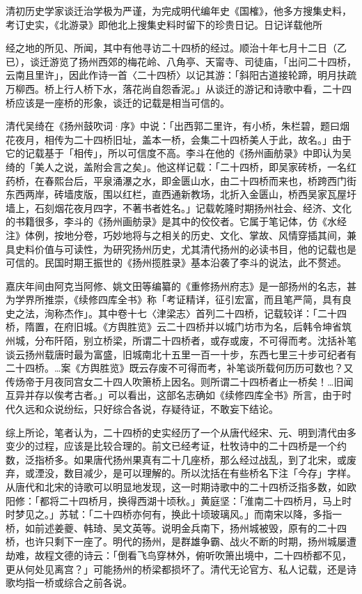 清初历史学家谈迁治学极为严谨，为完成明代编年史《国榷》，他多方搜集史料，考订史实，《北游录》即他北上搜集史料时留下的珍贵日记。日记详载他所


\noindent 经之地的所见、所闻，其中有他寻访二十四桥的经过。顺治十年七月十二日（乙已），谈迁游览了扬州西郊的梅花岭、八角亭、天甯寺、司徒庙，「出问二十四桥，云南且里许」，因此作诗一首〈二十四桥〉以记其游：「斜阳古道接轮蹄，明月扶疏万柳西。桥上行人桥下水，落花尚自怨香泥。」从谈迁的游记和诗歌中看，二十四桥应该是一座桥的形象，谈迁的记载是相当可信的。

清代吴绮在《扬州鼓吹词·序》中说：「出西郭二里许，有小桥，朱栏碧，题曰烟花夜月，相传为二十四桥旧址，盖本一桥，会集二十四桥美人于此，故名。」由于它的记载基于「相传」，所以可信度不高。李斗在他的《扬州画舫录》中即认为吴绮的「美人之说，盖附会言之矣」。他这样记载：「二十四桥，即吴家砖桥，一名红药桥，在春熙台后，平泉涌瀑之水，即金匮山水，由二十四桥而来也，桥跨西门街东西两岸，砖墙庋版，围以红栏，直西通新教场，北折入金匮山，桥西吴家瓦屋圩墙上，石刻烟花夜月四字，不著书者姓名。」记载乾隆时期扬州社会、经济、文化的书籍很多，李斗的《扬州画舫录》是其中的佼佼者。它属于笔记体，仿《水经注》体例，按地分卷，巧妙地将与之相关的历史、文化、掌故、风情穿插其间，兼具史料价值与可读性，为研究扬州历史，尤其清代扬州的必读书目，他的记载也是可信的。民国时期王振世的《扬州揽胜录》基本沿袭了李斗的说法，此不赘述。

嘉庆年间由阿克当阿修、姚文田等编纂的《重修扬州府志》是一部扬州的名志，甚为学界所推崇，《续修四库全书》称「考证精详，征引宏富，而且笔严简，具有良史之法，洵称杰作」。其中卷十七〈津梁志〉首列二十四桥，记载较详：「二十四桥，隋置，在府旧城。《方舆胜览》云二十四桥并以城门坊市为名，后韩令坤省筑州城，分布阡陌，别立桥梁，所谓二十四桥者，或存或废，不可得而考。沈括补笔谈云扬州载唐时最为富盛，旧城南北十五里一百一十步，东西七里三十步可纪者有二十四桥。…案《方舆胜览》既云存废不可得而考，补笔谈所载何历历可数也？又传炀帝于月夜同宫女二十四人吹箫桥上因名。则所谓二十四桥者止一桥矣！…旧闻互异并存以俟考古者。」可以看出，这部名志确如《续修四库全书》所言，由于时代久远和众说纷纭，只好综合各说，存疑待证，不敢妄下结论。


综上所论，笔者认为，二十四桥的史实经历了一个从唐代经宋、元、明到清代由多变少的过程，应该是比较合理的。前文已经考证，杜牧诗中的二十四桥是一个约数，泛指桥多。如果唐代扬州果真有二十几座桥，那么经过战乱，到了北宋，或废弃，或湮没，数目减少，是可以理解的。所以沈括在有些桥名下注「今存」字样。从唐代和北宋的诗歌可以明显地发现，这一时期诗歌中的二十四桥泛指多数，如欧阳修：「都将二十四桥月，换得西湖十顷秋。」黄庭坚：「淮南二十四桥月，马上时时梦见之。」苏轼：「二十四桥亦何有，换此十顷玻璃风。」而南宋以降，多指一桥，如前述姜夔、韩琦、吴文英等。说明金兵南下，扬州城被毁，原有的二十四桥，也许只剩下一座了。明代的扬州，是群雄争霸、战火不断的时期，扬州城屡遭劫难，故程文德的诗云：「倒看飞鸟穿林外，俯听吹箫出境中，二十四桥都不见，更从何处见离宫？」可能扬州的桥梁都损坏了。清代无论官方、私人记载，还是诗歌均指一桥或综合之前各说。

